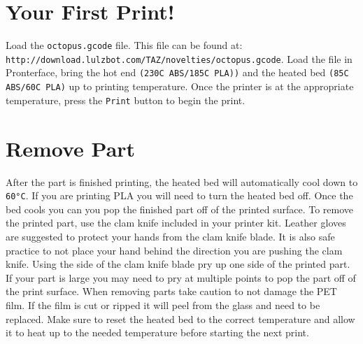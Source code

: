 \section{Your First Print!}
Load the \texttt{octopus.gcode} file.
This file can be found at:
\texttt{http://download.lulzbot.com/TAZ/novelties/octopus.gcode}. Load the file in Pronterface, bring the hot end \texttt{(230C ABS/185C PLA))} and the heated bed \texttt{(85C ABS/60C PLA)} up to printing temperature. Once the printer is at the appropriate temperature, press the \texttt{Print} button to begin the print.

\section{Remove Part}
After the part is finished printing, the heated bed will automatically cool down to \texttt{60°C}. If you are printing PLA you will need to turn the heated bed off. Once the bed cools you can you pop the finished part off of the printed surface. To remove the printed part, use the clam knife included in your printer kit. Leather gloves are suggested to protect your hands from the clam knife blade. It is also safe practice to not place your hand behind the direction you are pushing the clam knife. Using the side of the clam knife blade pry up one side of the printed part. If your part is large you may need to pry at multiple points to pop the part off of the print surface. When removing parts take caution to not damage the PET film. If the film is cut or ripped it will peel from the glass and need to be replaced. Make sure to reset the heated bed to the correct temperature and allow it to heat up to the needed temperature before starting the next print.

